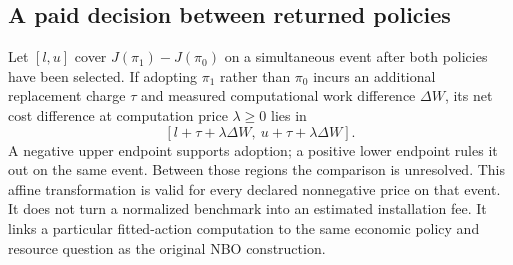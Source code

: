 \subsection{A paid decision between returned policies}
Let $[l,u]$ cover $J(\pi_1)-J(\pi_0)$ on a simultaneous event after both policies have been selected. If adopting $\pi_1$ rather than $\pi_0$ incurs an additional replacement charge $\tau$ and measured computational work difference $\Delta W$, its net cost difference at computation price $\lambda\ge0$ lies in
\begin{equation}\label{eq:incremental-adoption57}
 [l+\tau+\lambda\Delta W,\ u+\tau+\lambda\Delta W].
\end{equation}
A negative upper endpoint supports adoption; a positive lower endpoint rules it out on the same event. Between those regions the comparison is unresolved. This affine transformation is valid for every declared nonnegative price on that event. It does not turn a normalized benchmark into an estimated installation fee. It links a particular fitted-action computation to the same economic policy and resource question as the original NBO construction.
